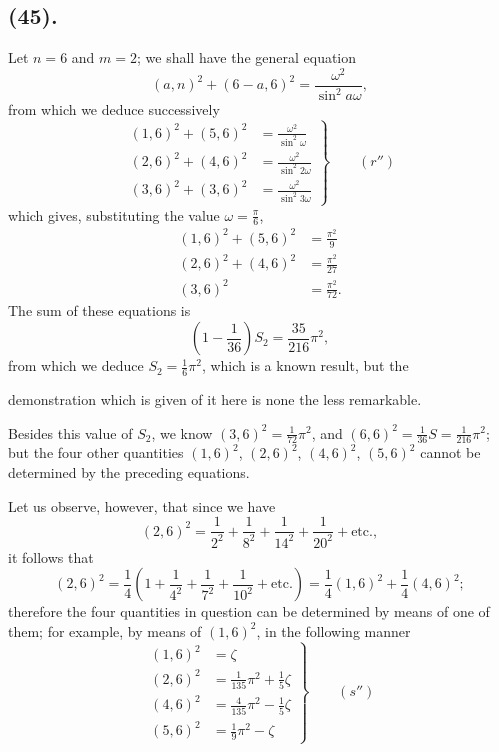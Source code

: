 \documentclass{article}
\begin{document}
\subsection*{(45).}

Let $n=6$ and $m=2$; we shall have the general equation
\[ (a,n)^{2}+(6-a,6)^{2}=\frac{\omega^{2}}{\sin^{2}a\omega}, \]
from which we deduce successively
\[ \left.\begin{aligned} (1,6)^{2}+(5,6)^{2}&=\frac{\omega^{2}}{\sin^{2}\omega}\\ (2,6)^{2}+(4,6)^{2}&=\frac{\omega^{2}}{\sin^{2}2\omega}\\ (3,6)^{2}+(3,6)^{2}&=\frac{\omega^{2}}{\sin^{2}3\omega} \end{aligned}\right\}\qquad(r'') \]
which gives, substituting the value $\omega=\frac{\pi}{6}$,
\[ \begin{aligned} (1,6)^{2}+(5,6)^{2}&=\frac{\pi^{2}}{9}\\ (2,6)^{2}+(4,6)^{2}&=\frac{\pi^{2}}{27}\\ (3,6)^{2}&=\frac{\pi^{2}}{72}. \end{aligned} \]
The sum of these equations is
\[ \left(1-\frac{1}{36}\right)S_{2}=\frac{35}{216}\pi^{2}, \]
from which we deduce $S_{2}=\frac{1}{6}\pi^{2}$, which is a known result, but the

demonstration which is given of it here is none the less remarkable.

Besides this value of $S_{2}$, we know $(3,6)^{2}=\frac{1}{72}\pi^{2}$, and $(6,6)^{2}=\frac{1}{36}S=\frac{1}{216}\pi^{2}$; but the four other quantities $(1,6)^{2}$, $(2,6)^{2}$, $(4,6)^{2}$, $(5,6)^{2}$ cannot be determined by the preceding equations.

Let us observe, however, that since we have
\[ (2,6)^{2}=\frac{1}{2^{2}}+\frac{1}{8^{2}}+\frac{1}{14^{2}}+\frac{1}{20^{2}}+\text{etc.}, \]
it follows that
\[ (2,6)^{2}=\frac{1}{4}\left(1+\frac{1}{4^{2}}+\frac{1}{7^{2}}+\frac{1}{10^{2}}+\text{etc.}\right)=\frac{1}{4}(1,6)^{2}+\frac{1}{4}(4,6)^{2}; \]
therefore the four quantities in question can be determined by means of one of them; for example, by means of $(1,6)^{2}$, in the following manner
\[ \left.\begin{aligned} (1,6)^{2}&=\zeta\\ (2,6)^{2}&=\frac{1}{135}\pi^{2}+\frac{1}{5}\zeta\\ (4,6)^{2}&=\frac{4}{135}\pi^{2}-\frac{1}{5}\zeta\\ (5,6)^{2}&=\frac{1}{9}\pi^{2}-\zeta \end{aligned}\right\}\qquad(s'') \]
\end{document}
